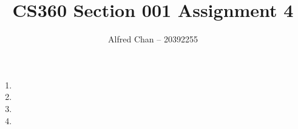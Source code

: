 \documentclass[12pt]{article}
\title{CS360 Section 001 Assignment 4}
\author{Alfred Chan -- 20392255}
\begin{document}
\maketitle

\begin{enumerate}
\item
\item
\item
\item
\end{enumerate}
\end{document}
